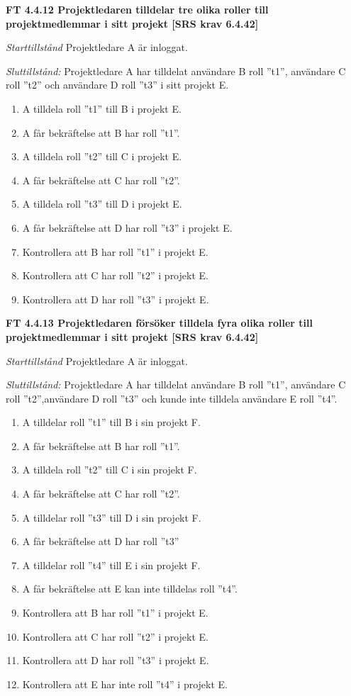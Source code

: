 \documentclass[a4paper]{article}
\begin{document}
\textbf{FT 4.4.12 Projektledaren tilldelar tre olika roller till projektmedlemmar i sitt projekt [SRS krav 6.4.42]}

\emph{Starttillstånd} Projektledare A är inloggat.

\emph{Sluttillstånd:} Projektledare A  har tilldelat användare B roll ”t1”, användare C roll ”t2” och användare D roll ”t3” i sitt projekt E.

\begin{enumerate}
\item A tilldela roll ”t1” till B i projekt E.
\item A får bekräftelse att B har roll ”t1”.
\item A tilldela roll ”t2” till C i projekt E.
\item A får bekräftelse att C har roll ”t2”.
\item A tilldela roll ”t3” till D i projekt E.
\item A får bekräftelse att D har roll ”t3” i projekt E.
\item Kontrollera att B har roll ”t1” i projekt E.
\item Kontrollera att C har roll ”t2” i projekt E.
\item Kontrollera att D har roll ”t3” i projekt E.
\end{enumerate}

\textbf{FT 4.4.13 Projektledaren försöker tilldela fyra olika roller till projektmedlemmar i sitt projekt [SRS krav 6.4.42]}

\emph{Starttillstånd} Projektledare A är inloggat.

\emph{Sluttillstånd:} Projektledare A  har tilldelat användare B roll ”t1”, användare C roll ”t2”,användare D roll ”t3” och kunde inte tilldela användare E roll ”t4”.

\begin{enumerate}
\item A tilldelar roll ”t1” till B i sin projekt F.
\item A får bekräftelse att  B har roll ”t1”.
\item A tilldela roll ”t2” till C i sin projekt F.
\item A får bekräftelse att C har roll ”t2”.
\item A tilldelar roll ”t3” till D i sin projekt F.
\item A får bekräftelse att D har roll ”t3”
\item A tilldelar roll ”t4” till E i sin projekt F.
\item A får bekräftelse att E kan inte tilldelas roll ”t4”.
\item Kontrollera att B har roll ”t1” i projekt E.
\item Kontrollera att C har roll ”t2” i projekt E.
\item Kontrollera att D har roll ”t3” i projekt E.
\item Kontrollera att E har inte roll ”t4” i projekt E.
\end{enumerate}
\end{document}
